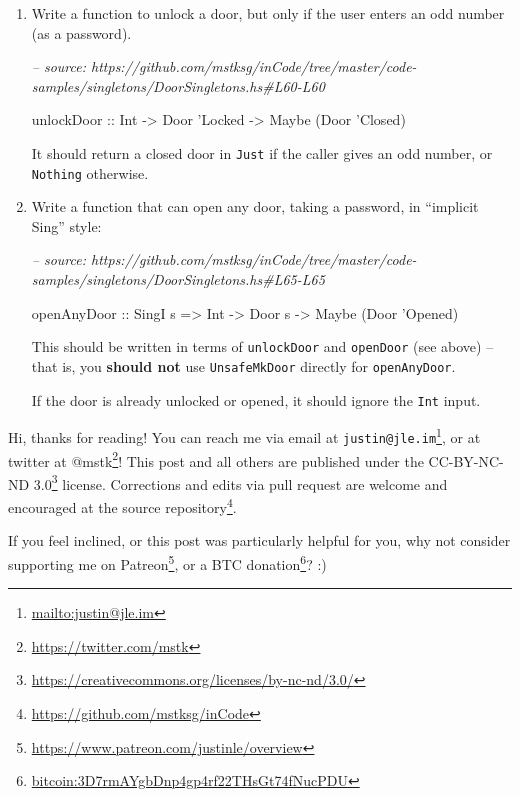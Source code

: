 \documentclass[]{article}
\newenvironment{Shaded}{}{}
\newcommand{\CommentTok}[1]{\textcolor[rgb]{0.38,0.63,0.69}{\textit{#1}}}
\newcommand{\DataTypeTok}[1]{\textcolor[rgb]{0.56,0.13,0.00}{#1}}
\newcommand{\NormalTok}[1]{#1}
\newcommand{\OtherTok}[1]{\textcolor[rgb]{0.00,0.44,0.13}{#1}}
\renewcommand{\href}[2]{#2\footnote{\url{#1}}}
\begin{document}
\begin{enumerate}
\def\labelenumi{\arabic{enumi}.}
\item
  Write a function to unlock a door, but only if the user enters an odd number
  (as a password).

\begin{Shaded}
\begin{Highlighting}[]
\CommentTok{-- source: https://github.com/mstksg/inCode/tree/master/code-samples/singletons/DoorSingletons.hs#L60-L60}

\OtherTok{unlockDoor ::} \DataTypeTok{Int} \OtherTok{->} \DataTypeTok{Door}\NormalTok{ '}\DataTypeTok{Locked} \OtherTok{->} \DataTypeTok{Maybe}\NormalTok{ (}\DataTypeTok{Door}\NormalTok{ '}\DataTypeTok{Closed}\NormalTok{)}
\end{Highlighting}
\end{Shaded}

  It should return a closed door in \texttt{Just} if the caller gives an odd
  number, or \texttt{Nothing} otherwise.
\item
  Write a function that can open any door, taking a password, in ``implicit
  Sing'' style:

\begin{Shaded}
\begin{Highlighting}[]
\CommentTok{-- source: https://github.com/mstksg/inCode/tree/master/code-samples/singletons/DoorSingletons.hs#L65-L65}

\OtherTok{openAnyDoor ::} \DataTypeTok{SingI}\NormalTok{ s }\OtherTok{=>} \DataTypeTok{Int} \OtherTok{->} \DataTypeTok{Door}\NormalTok{ s }\OtherTok{->} \DataTypeTok{Maybe}\NormalTok{ (}\DataTypeTok{Door}\NormalTok{ '}\DataTypeTok{Opened}\NormalTok{)}
\end{Highlighting}
\end{Shaded}

  This should be written in terms of \texttt{unlockDoor} and \texttt{openDoor}
  (see above) -- that is, you \textbf{should not} use \texttt{UnsafeMkDoor}
  directly for \texttt{openAnyDoor}.

  If the door is already unlocked or opened, it should ignore the \texttt{Int}
  input.
\end{enumerate}

Hi, thanks for reading! You can reach me via email at
\href{mailto:justin@jle.im}{\nolinkurl{justin@jle.im}}, or at twitter at
\href{https://twitter.com/mstk}{@mstk}! This post and all others are published
under the \href{https://creativecommons.org/licenses/by-nc-nd/3.0/}{CC-BY-NC-ND
3.0} license. Corrections and edits via pull request are welcome and encouraged
at \href{https://github.com/mstksg/inCode}{the source repository}.

If you feel inclined, or this post was particularly helpful for you, why not
consider \href{https://www.patreon.com/justinle/overview}{supporting me on
Patreon}, or a \href{bitcoin:3D7rmAYgbDnp4gp4rf22THsGt74fNucPDU}{BTC donation}?
:)
\end{document}
